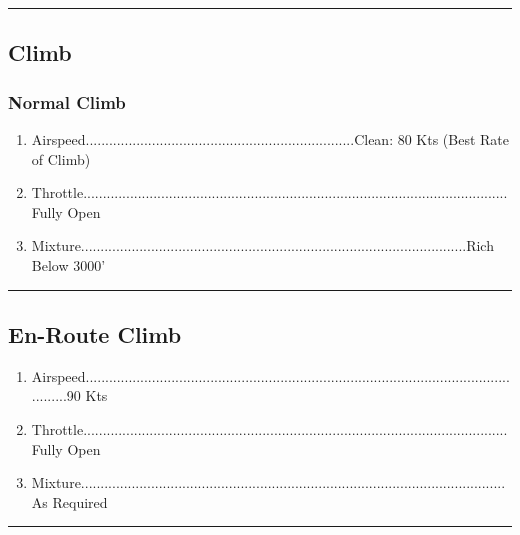 \documentclass[a4paper]{article}
\newenvironment{numberedchecklist}{
  \begin{enumerate}[label=\arabic*., leftmargin=*, align=left]
    \setlength{\itemsep}{2pt}
    \setlength{\parskip}{0pt}
    \setlength{\parsep}{0pt}
}{
  \end{enumerate}
}
\begin{document}
\rule{\linewidth}{0.4pt}

\subsection*{Climb}

\subsubsection*{Normal Climb}
\begin{numberedchecklist}
\item Airspeed.....................................................................Clean: 80 Kts (Best Rate of Climb)
\item Throttle.............................................................................................................Fully Open
\item Mixture...................................................................................................Rich Below 3000’
\end{numberedchecklist}

\rule{\linewidth}{0.4pt}

\subsection*{En-Route Climb}
\begin{numberedchecklist}
\item Airspeed......................................................................................................................90 Kts
\item Throttle.............................................................................................................Fully Open
\item Mixture.............................................................................................................As Required
\end{numberedchecklist}

\rule{\linewidth}{0.4pt}
\end{document}
